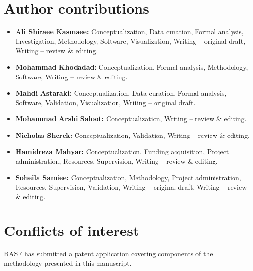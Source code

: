 \documentclass[twoside,twocolumn,9pt]{article}
\begin{document}
\section*{Author contributions}
\begin{itemize}
    \setlength\itemsep{0em}
    \item \textbf{Ali Shiraee Kasmaee:} Conceptualization, Data curation, Formal analysis, Investigation, Methodology, Software, Visualization, Writing – original draft, Writing – review \& editing.
    \item \textbf{Mohammad Khodadad:} Conceptualization, Formal analysis, Methodology, Software, Writing – review \& editing.
    \item \textbf{Mahdi Astaraki:} Conceptualization, Data curation, Formal analysis, Software, Validation, Visualization, Writing – original draft.
    \item \textbf{Mohammad Arshi Saloot:} Conceptualization, Writing – review \& editing.
    \item \textbf{Nicholas Sherck:} Conceptualization, Validation, Writing – review \& editing.
    \item \textbf{Hamidreza Mahyar:} Conceptualization, Funding acquisition, Project administration, Resources, Supervision, Writing – review \& editing.
    \item \textbf{Soheila Samiee:} Conceptualization, Methodology, Project administration, Resources, Supervision, Validation, Writing – original draft, Writing – review \& editing.
\end{itemize}

\section*{Conflicts of interest}
BASF has submitted a patent application covering components of the methodology presented in this manuscript.
\end{document}
